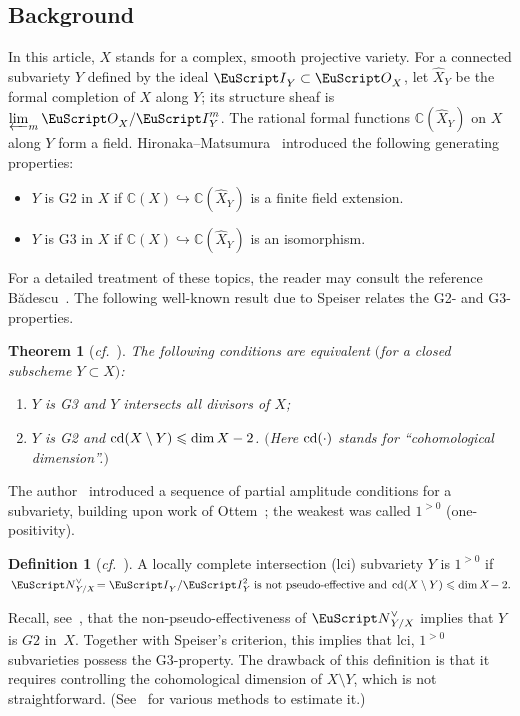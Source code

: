 \documentclass[10pt,a4paper]{article}
\numberwithin{equation}{section}
\newtheorem*{thm-nono}{Theorem}
\theoremstyle{definition}
\newtheorem{m-definition}[m-theorem]{Definition}
\theoremstyle{remark}
\let\euf\EuScript %
\let\mbb\mathbb
\let\les\leqslant
\let\hra\hookrightarrow
\let\sm\setminus
\newcommand{\cd}{\mathop{\rm cd}\nolimits}
\renewcommand{\dim}{\mathop{\rm dim}\nolimits}
\newcommand{\kk}{{\mbb C}}%
\newcommand{\eI}{{\euf I}}
\newcommand{\pos}{{>0}}
\newcommand{\eN}{{\euf N}}
\newcommand{\eO}{{\euf O}}
\newcommand{\XX}{X}
\newcommand{\YY}{Y}
\begin{document}
\subsection{Background}\label{ssct:setup}

In this article, $\XX$ stands for a complex, smooth projective variety. For a connected subvariety $\YY$ defined by the ideal $\eI_\YY\subset\eO_\XX$, let $\hat \XX_\YY$ be the formal completion of $\XX$ along $\YY$; its structure sheaf is ${\varprojlim}_m\,\eO_\XX/\eI_\YY^{m}$. The rational formal functions $\kk(\hat \XX_\YY)$ on $\XX$ along $\YY$ form a field. 
Hironaka--Matsumura~\cite{hir-mat} introduced the following generating properties: 
\begin{itemize}
\item $\YY$ is G2 in $\XX$ if $\kk(\XX)\hra \kk(\hat \XX_\YY)$ is a finite field extension. 
\item $\YY$ is G3 in $\XX$ if $\kk(\XX)\hra \kk(\hat \XX_\YY)$ is an isomorphism.
\end{itemize}
For a detailed treatment of these topics, the reader may consult the reference B\u{a}descu~\cite{bad}. The following well-known result due to Speiser relates the G2- and G3-properties.

\begin{thm-nono}[\textit{cf.}~\cite{hart-as}]
The following conditions are equivalent $($for a closed subscheme $\YY\subset\XX)$: 
\begin{enumerate}
\item $\YY$ is G3 and $\YY$ intersects all divisors of $\XX$;
\item $\YY$ is G2 and $\cd(\XX\sm \YY)\les\dim\XX-2$. 
$($Here $\cd(\cdot)$ stands for ``cohomological dimension''.$)$
\end{enumerate}
\end{thm-nono}

The author~\cite{hlc-pas} introduced a sequence of partial amplitude conditions for a subvariety, building upon work of Ottem~\cite{ottm}; the weakest was called $1^\pos$ (one-positivity). 

\begin{m-definition}[\textit{cf.}~{\cite[Proposition 1.6(iii)]{hlc-pas}}]
A locally complete intersection (lci) subvariety $\YY$ is $1^\pos$ if $\,\eN_{\YY/\XX}^\vee\!=\eI_\YY/\eI_\YY^2\;\text{is not pseudo-effective and}\;\cd(\XX\sm\YY)\les\dim\XX\!-2.$
\end{m-definition}

Recall, see~\cite[Corollary 2.6]{hlc-g2}, that the non-pseudo-effectiveness of $\eN_{\YY/\XX}^\vee$ implies that $\YY$ is $G2$ in~$\XX$. Together with Speiser's criterion, this implies that lci, $1^\pos$ subvarieties possess the G3-property. The drawback of this definition is that it requires controlling the cohomological dimension of $\XX\sm\YY$, which is not straightforward. (See~\cite{hlc+taj} for various methods to estimate it.)
\end{document}
